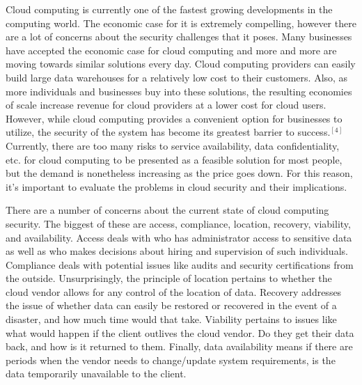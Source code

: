 \documentclass[a4paper, 8pt]{article} %
\begin{document}
\begin{doublespacing}

Cloud computing is currently one of the fastest growing developments in the computing world.  The economic case for it is extremely compelling, however there are a lot of concerns about the security challenges that it poses.  Many businesses have accepted the economic case for cloud computing and more and more are moving towards similar solutions every day.  Cloud computing providers can easily build large data warehouses for a relatively low cost to their customers.  Also, as more individuals and businesses buy into these solutions, the resulting economies of scale increase revenue for cloud providers at a lower cost for cloud users.  However, while cloud computing provides a convenient option for businesses to utilize, the security of the system has become its greatest barrier to success.$^{[4]}$  Currently, there are too many risks to service availability, data confidentiality, etc. for cloud computing to be presented as a feasible solution for most people, but the demand is nonetheless increasing as the price goes down.  For this reason, it's important to evaluate the problems in cloud security and their implications.  


There are a number of concerns about the current state of cloud computing security.  The biggest of these are access, compliance, location, recovery, viability, and availability.  Access deals with who has administrator access to sensitive data as well as who makes decisions about hiring and supervision of such individuals.  Compliance deals with potential issues like audits and security certifications from the outside.  Unsurprisingly, the principle of location pertains to whether the cloud vendor allows for any control of the location of data.  Recovery addresses the issue of whether data can easily be restored or recovered in the event of a disaster, and how much time would that take.  Viability pertains to issues like what would happen if the client outlives the cloud vendor.  Do they get their data back, and how is it returned to them.  Finally, data availability means if there are periods when the vendor needs to change/update system requirements, is the data temporarily unavailable to the client.  


\end{doublespacing}
\end{document}
